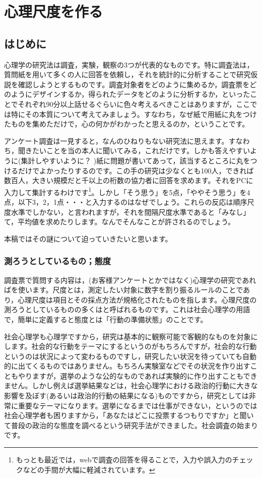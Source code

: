 \documentclass{ltjsbook}
\begin{document}
 
\chapter{心理尺度を作る}
\label{chapter2}
\section{はじめに} 
心理学の研究法は調査，実験，観察の3つが代表的なものです。特に調査法は，質問紙を用いて多くの人に回答を依頼し，それを統計的に分析することで研究仮説を確認しようとするものです。調査対象者をどのように集めるか，調査票をどのようにデザインするか，得られたデータをどのように分析するか，といったことでそれぞれ90分以上話せるぐらいに色々考えるべきことはありますが，ここでは特にその本質について考えてみましょう。すなわち，なぜ紙で用紙に丸をつけたものを集めただけで，心の何かがわかったと思えるのか，ということです。

アンケート調査は一見すると，なんのひねりもない研究法に思えます。すなわち，聞きたいことを当の本人に聞いてみる，これだけです。しかも答えやすいように(集計しやすいように？ )紙に問題が書いてあって，該当するところに丸をつけるだけでよかったりするのです。この手の研究は少なくとも100人，できれば数百人，大きい規模だと千以上の桁数の協力者に回答を求めます。それをPCに入力して集計するわけです\footnote{もっとも最近では，webで調査の回答を得ることで，入力や誤入力のチェックなどの手間が大幅に軽減されています。}。しかし「そう思う」を5点，「ややそう思う」を4点，以下3，2，1点・・・と入力するのはなぜでしょう。これらの反応は順序尺度水準でしかない，と言われますが，それを間隔尺度水準であると「みなし」て，平均値を求めたりします。なんでそんなことが許されるのでしょう。

本稿ではその謎について迫っていきたいと思います。
\subsection{測ろうとしているもの；態度}
調査票で質問する内容は，(お客様アンケートとかではなく)心理学の研究であればを使います。尺度とは，測定したい対象に数字を割り振るルールのことであり，心理尺度は項目とその採点方法が規格化されたものを指します。心理尺度の測ろうとしているものの多くはと呼ばれるものです。これは社会心理学の用語で，簡単に定義すると態度とは「行動の準備状態」のことです。

社会心理学も心理学ですから，研究は基本的に観察可能で客観的なものを対象にします。社会的な行動をテーマにするというのがもちろんですが，社会的な行動というのは状況によって変わるものですし，研究したい状況を待っていても自動的に出てくるものではありません。もちろん実験室などでその状況を作り出すこともやりますが，選挙のような公的なものであれば実験的に作り出すこともできません。しかし例えば選挙結果などは，社会心理学における政治的行動に大きな影響を及ぼす(あるいは政治的行動の結果になる)ものですから，研究としては非常に重要なテーマになります。選挙になるまでは仕事ができない，というのでは社会心理学者も困りますから，「あなたはどこに投票するつもりですか」と聞いて普段の政治的な態度を調べるという研究手法ができました。社会調査の始まりです。
\end{document}
